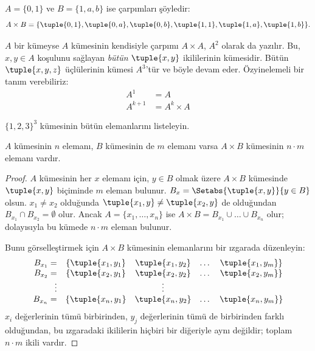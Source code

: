 \documentclass[../../../include/open-logic-section]{subfiles}
\begin{document}
\begin{ex}
$A = \{0, 1\}$ ve $B = \{1, a, b\}$ ise çarpımları şöyledir:
\[
A \times B = \{ \tuple{0, 1}, \tuple{0, a}, \tuple{0, b},
    \tuple{1, 1}, \tuple{1, a}, \tuple{1, b} \}.
\]
\end{ex}

\begin{ex}
$A$ bir kümeyse $A$ kümesinin kendisiyle çarpımı $A \times A$, $A^2$ olarak da
yazılır. Bu, $x, y \in A$ koşulunu sağlayan \emph{bütün}
$\tuple{x, y}$ ikililerinin kümesidir. Bütün $\tuple{x, y, z}$ üçlülerinin
kümesi $A^3$'tür ve böyle devam eder. Özyinelemeli bir tanım verebiliriz:
\begin{align*}
  A^1 & = A\\
  A^{k+1} & = A^k \times A
\end{align*}
\end{ex}

\begin{prob}
$\{1, 2, 3\}^3$ kümesinin bütün elemanlarını listeleyin.
\end{prob}

\begin{prop}
$A$ kümesinin $n$ elemanı, $B$ kümesinin de $m$ elemanı varsa $A \times B$
kümesinin $n\cdot m$ elemanı vardır.
\end{prop}

\begin{proof}
$A$ kümesinin her $x$ elemanı için, $y \in B$ olmak üzere $A \times B$
kümesinde $\tuple{x, y}$ biçiminde $m$ eleman bulunur.
$B_x = \Setabs{\tuple{x, y}}{y \in B}$ olsun. $x_1 \neq x_2$ olduğunda
$\tuple{x_1, y} \neq \tuple{x_2, y}$ de olduğundan
$B_{x_1} \cap B_{x_2} = \emptyset$ olur. Ancak
$A = \{x_1, \dots, x_n\}$ ise
$A \times B = B_{x_1} \cup \dots \cup B_{x_n}$ olur; dolayısıyla bu kümede
$n\cdot m$ eleman bulunur.

Bunu görselleştirmek için $A \times B$ kümesinin elemanlarını bir
ızgarada düzenleyin:
\[
\begin{array}{rcccc}
  B_{x_1} = & \{\tuple{x_1, y_1} & \tuple{x_1, y_2} & \dots & \tuple{x_1, y_m}\}\\
  B_{x_2} = & \{\tuple{x_2, y_1} & \tuple{x_2, y_2} & \dots & \tuple{x_2, y_m}\}\\
  \vdots & & \vdots\\
  B_{x_n} = & \{\tuple{x_n, y_1} & \tuple{x_n, y_2} & \dots & \tuple{x_n, y_m}\}
\end{array}
\]
$x_i$ değerlerinin tümü birbirinden, $y_j$ değerlerinin tümü de birbirinden
farklı olduğundan, bu ızgaradaki ikililerin hiçbiri bir diğeriyle aynı değildir;
toplam $n\cdot m$ ikili vardır.
\end{proof}
\end{document}
